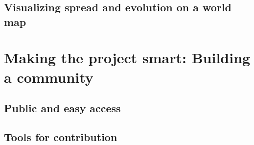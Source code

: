 \documentclass{beamer}
\begin{document}
\begin{darkframes}
    \subsection{Visualizing spread and evolution on a world map}
  \section{Making the project smart: Building a community}
    \subsection{Public and easy access}
    \subsection{Tools for contribution}


  \end{darkframes}
\end{document}
